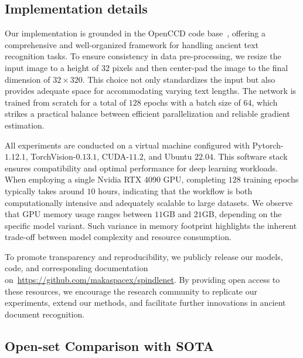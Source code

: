 \subsection{Implementation details}
 Our implementation is grounded in the OpenCCD code base~\cite{vsdf}, offering a comprehensive and well-organized framework for handling ancient text recognition tasks. To ensure consistency in data pre-processing, we resize the input image to a height of $32$ pixels and then center-pad the image to the final dimension of $32\times 320$. This choice not only standardizes the input but also provides adequate space for accommodating varying text lengths. The network is trained from scratch for a total of $128$ epochs with a batch size of $64$, which strikes a practical balance between efficient parallelization and reliable gradient estimation.

All experiments are conducted on a virtual machine configured with Pytorch-$1.12.1$, TorchVision-$0.13.1$, CUDA-$11.2$, and Ubuntu $22.04$. This software stack ensures compatibility and optimal performance for deep learning workloads. When employing a single Nvidia RTX 4090 GPU, completing $128$ training epochs typically takes around $10$ hours, indicating that the workflow is both computationally intensive and adequately scalable to large datasets. We observe that GPU memory usage ranges between $11$GB and $21$GB, depending on the specific model variant. Such variance in memory footprint highlights the inherent trade-off between model complexity and resource consumption.

To promote transparency and reproducibility, we publicly release our models, code, and corresponding documentation on~\url{https://github.com/makaspacex/spindlenet}. By providing open access to these resources, we encourage the research community to replicate our experiments, extend our methods, and facilitate further innovations in ancient document recognition.

\subsection{Open-set Comparison with SOTA}

